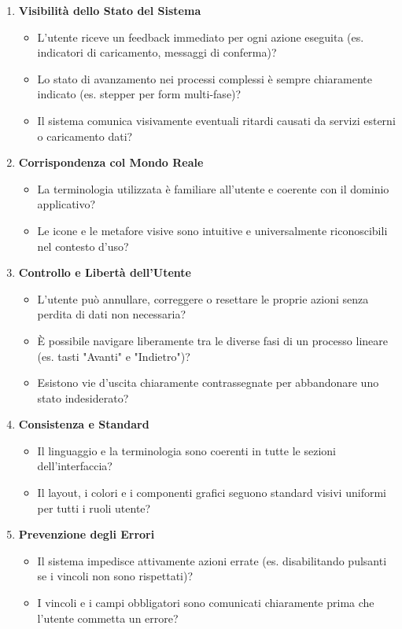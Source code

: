 \documentclass{article}
\begin{document}
\begin{enumerate}
    \item \textbf{Visibilità dello Stato del Sistema}
    \begin{itemize}
        \item L'utente riceve un feedback immediato per ogni azione eseguita (es. indicatori di caricamento, messaggi di conferma)?
        \item Lo stato di avanzamento nei processi complessi è sempre chiaramente indicato (es. stepper per form multi-fase)?
        \item Il sistema comunica visivamente eventuali ritardi causati da servizi esterni o caricamento dati?
    \end{itemize}

    \item \textbf{Corrispondenza col Mondo Reale}
    \begin{itemize}
        \item La terminologia utilizzata è familiare all'utente e coerente con il dominio applicativo?
        \item Le icone e le metafore visive sono intuitive e universalmente riconoscibili nel contesto d'uso?
    \end{itemize}

    \item \textbf{Controllo e Libertà dell'Utente}
    \begin{itemize}
        \item L'utente può annullare, correggere o resettare le proprie azioni senza perdita di dati non necessaria?
        \item È possibile navigare liberamente tra le diverse fasi di un processo lineare (es. tasti "Avanti" e "Indietro")?
        \item Esistono vie d'uscita chiaramente contrassegnate per abbandonare uno stato indesiderato?
    \end{itemize}

    \item \textbf{Consistenza e Standard}
    \begin{itemize}
        \item Il linguaggio e la terminologia sono coerenti in tutte le sezioni dell'interfaccia?
        \item Il layout, i colori e i componenti grafici seguono standard visivi uniformi per tutti i ruoli utente?
    \end{itemize}

    \item \textbf{Prevenzione degli Errori}
    \begin{itemize}
        \item Il sistema impedisce attivamente azioni errate (es. disabilitando pulsanti se i vincoli non sono rispettati)?
        \item I vincoli e i campi obbligatori sono comunicati chiaramente prima che l'utente commetta un errore?
    \end{itemize}


\end{enumerate}
\end{document}
